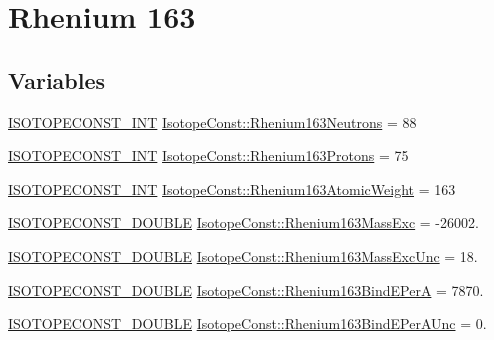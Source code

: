\hypertarget{group___isotope_const-_rhenium-_re163}{}\section{Rhenium 163}
\label{group___isotope_const-_rhenium-_re163}
\subsection*{Variables}
\begin{DoxyCompactItemize}
\item 
\mbox{\hyperlink{group___isotope_const-_macros_ga5f18360b3e99483a35c32d789e62621c}{I\+S\+O\+T\+O\+P\+E\+C\+O\+N\+S\+T\+\_\+\+I\+NT}} \mbox{\hyperlink{group___isotope_const-_rhenium-_re163_ga071b14705c95939c49013056a45c7258}{Isotope\+Const\+::\+Rhenium163\+Neutrons}} = 88
\item 
\mbox{\hyperlink{group___isotope_const-_macros_ga5f18360b3e99483a35c32d789e62621c}{I\+S\+O\+T\+O\+P\+E\+C\+O\+N\+S\+T\+\_\+\+I\+NT}} \mbox{\hyperlink{group___isotope_const-_rhenium-_re163_ga5c99002f25343980e7a7c523e4124475}{Isotope\+Const\+::\+Rhenium163\+Protons}} = 75
\item 
\mbox{\hyperlink{group___isotope_const-_macros_ga5f18360b3e99483a35c32d789e62621c}{I\+S\+O\+T\+O\+P\+E\+C\+O\+N\+S\+T\+\_\+\+I\+NT}} \mbox{\hyperlink{group___isotope_const-_rhenium-_re163_gaf8335fdc1af4f2ec60611fa8a2136bd5}{Isotope\+Const\+::\+Rhenium163\+Atomic\+Weight}} = 163
\item 
\mbox{\hyperlink{group___isotope_const-_macros_ga8f45a7272ce02c0b4c65c44636ed719a}{I\+S\+O\+T\+O\+P\+E\+C\+O\+N\+S\+T\+\_\+\+D\+O\+U\+B\+LE}} \mbox{\hyperlink{group___isotope_const-_rhenium-_re163_gaa3cd4494c5b6710c410595c4ba241f6e}{Isotope\+Const\+::\+Rhenium163\+Mass\+Exc}} = -\/26002.
\item 
\mbox{\hyperlink{group___isotope_const-_macros_ga8f45a7272ce02c0b4c65c44636ed719a}{I\+S\+O\+T\+O\+P\+E\+C\+O\+N\+S\+T\+\_\+\+D\+O\+U\+B\+LE}} \mbox{\hyperlink{group___isotope_const-_rhenium-_re163_gaf49faef2141d3ffd6a69cd48540b3431}{Isotope\+Const\+::\+Rhenium163\+Mass\+Exc\+Unc}} = 18.
\item 
\mbox{\hyperlink{group___isotope_const-_macros_ga8f45a7272ce02c0b4c65c44636ed719a}{I\+S\+O\+T\+O\+P\+E\+C\+O\+N\+S\+T\+\_\+\+D\+O\+U\+B\+LE}} \mbox{\hyperlink{group___isotope_const-_rhenium-_re163_ga2badf49bc9b32f5b0c0b6f8b46ec4535}{Isotope\+Const\+::\+Rhenium163\+Bind\+E\+PerA}} = 7870.
\item 
\mbox{\hyperlink{group___isotope_const-_macros_ga8f45a7272ce02c0b4c65c44636ed719a}{I\+S\+O\+T\+O\+P\+E\+C\+O\+N\+S\+T\+\_\+\+D\+O\+U\+B\+LE}} \mbox{\hyperlink{group___isotope_const-_rhenium-_re163_gaab3a46a4cdca972159575562044102a0}{Isotope\+Const\+::\+Rhenium163\+Bind\+E\+Per\+A\+Unc}} = 0.

\end{DoxyCompactItemize}
